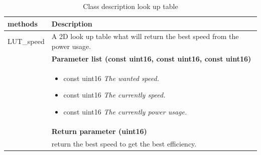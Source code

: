 \begin{table}[H]
	\centering
	\begin{tabular}{|p{5 cm}|p{10 cm}|}
		\hline
		\textbf{methods} & \textbf{Description} \\ \hline
		
		LUT\_speed
		& A 2D look up table what will return the best speed from the power usage.
		\\ & \textbf{Parameter list (const uint16, const uint16, const uint16)}
		\\ & \begin{itemize}
			\item {\large const uint16}
			\subitem \textit{The wanted speed.}
			\item {\large const uint16}
			\subitem \textit{The currently speed.}
			\item {\large const uint16}
			\subitem \textit{The currently power usage.}
		\end{itemize}
		\\ & \textbf{Return parameter (uint16)}
		\\ & return the best speed to get the best efficiency.
		\\ \hline
		
	\end{tabular}
	\caption{Class description look up table}
	\label{table:Class_description_MCU_LUT}
\end{table}

